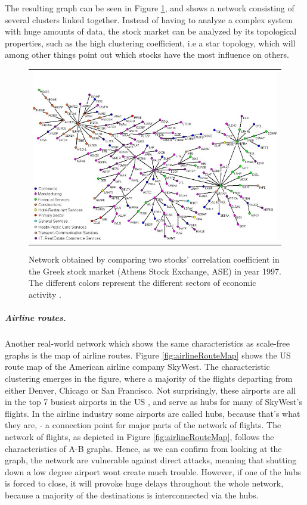 The resulting graph can be seen in Figure \ref{fig:greekStockMarket}, and shows a network consisting of several clusters linked together. Instead of having to analyze a complex system with huge amounts of data, the stock market can be analyzed by its topological properties, such as the high clustering coefficient, i.e a star topology, which will among other things point out which stocks have the most influence on others. 
\begin{figure}[h]
\centering
\begin{tabular}{@{}c@{}}
\includegraphics[width=1.0\textwidth]{../Figures/greekStockMarket.jpg}
\end{tabular}
\caption[Caption for LOF]{Network obtained by comparing two stocks' correlation coefficient in the Greek stock market (Athens Stock Exchange, ASE) in year 1997. The different colors represent the different sectors of economic activity \cite{greekStockMarket}.
\label{fig:greekStockMarket}}
\end{figure}

\subparagraph{Airline routes.}
Another real-world network which shows the same characteristics as scale-free graphs is the map of airline routes. Figure \ref{fig:airlineRouteMap} shows the US route map of the American airline company SkyWest. The characteristic clustering emerges in the figure, where a majority of the flights departing from either Denver, Chicago or San Francisco. Not surprisingly, these airports are all in the top 7 busiest airports in the US \cite{busiestAirports}, and serve as hubs for many of SkyWest's flights. In the airline industry some airports are called hubs, because that's what they are, - a connection point for major parts of the network of flights. The network of flights, as depicted in Figure \ref{fig:airlineRouteMap}, follows the characteristics of A-B graphs. Hence, as we can confirm from looking at the graph, the network are vulnerable against direct attacks, meaning that shutting down a low degree airport wont create much trouble. However, if one of the hubs is forced to close, it will provoke huge delays throughout the whole network, because a majority of the destinations is interconnected via the hubs. 


